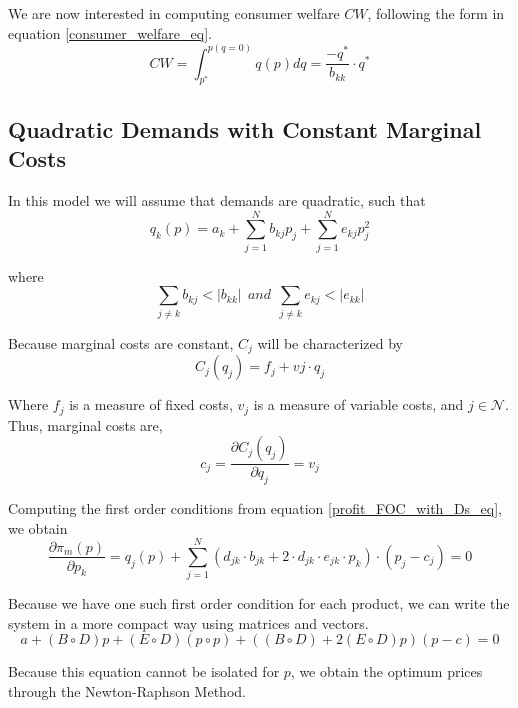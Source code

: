\documentclass[12pt]{article}
\begin{document}
We are now interested in computing consumer welfare $CW$, following the form in equation \ref{consumer_welfare_eq}.
\begin{equation*}
CW = \int_{p^*}^{p(q = 0)} q(p) dq = \frac{-q^*}{b_{kk}} \cdot q^*
\end{equation*}

\subsection{Quadratic Demands with Constant Marginal Costs}

In this model we will assume that demands are quadratic, such that
\begin{equation*}
q_k(p) = a_k + \sum_{j=1}^N b_{kj}p_j + \sum_{j=1}^N e_{kj} p_j^2
\end{equation*}

where
\begin{equation*}
\sum_{j \neq k} b_{kj} < |b_{kk}| \ \ and \ \ \sum_{j \neq k} e_{kj} < |e_{kk}|
\end{equation*}

Because marginal costs are constant, $C_j$ will be characterized by 
\begin{equation*}
C_j(q_j) = f_j + vj \cdot q_j
\end{equation*}

Where $f_j$ is a measure of fixed costs, $v_j$ is a measure of variable costs, and $j \in \mathcal{N}$. Thus, marginal costs are,
\begin{equation*}
c_j = \frac{\partial C_j(q_j)}{\partial q_j} = v_j
\end{equation*}

Computing the first order conditions from equation \ref{profit_FOC_with_Ds_eq}, we obtain
\begin{equation*}
\frac{\partial \pi_m(p)}{\partial p_k} = q_j(p) + \sum_{j=1}^N (d_{jk} \cdot b_{jk} + 2 \cdot d_{jk} \cdot e_{jk} \cdot p_k) \cdot (p_j - c_j) = 0
\end{equation*}

Because we have one such first order condition for each product, we can write the system in a more compact way using matrices and vectors.
\begin{equation*}
a +(B \circ D) p + (E \circ D) (p \circ p) + ((B \circ D) + 2 (E \circ D) p) (p - c) = 0 
\end{equation*}

Because this equation cannot be isolated for $p$, we obtain the optimum prices through the Newton-Raphson Method.
\end{document}
